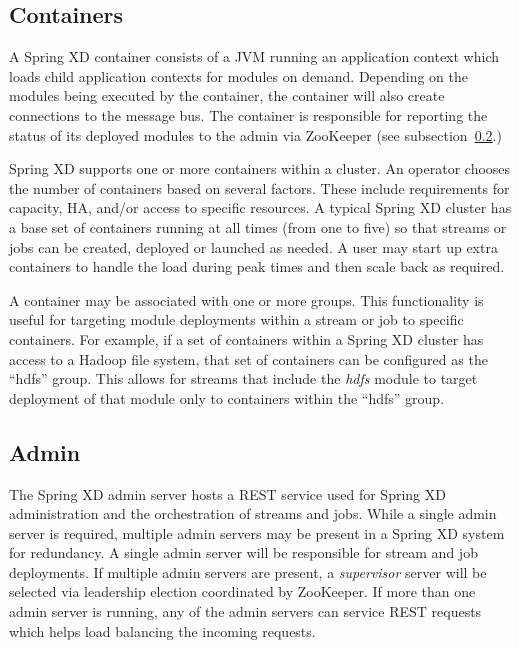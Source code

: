 \subsection{Containers}
A Spring XD container consists of a JVM running an application context which
loads child application contexts for modules on demand. Depending on the modules
being executed by the container, the container will also create connections to
the message bus. The container is responsible for reporting the status of its deployed
modules to the admin via ZooKeeper (see subsection~\ref{subsec:Admin}.)

Spring XD supports one or more containers within a cluster. An operator
chooses the number of containers based on several factors. These include requirements
for capacity, HA, and/or access to specific resources. A typical Spring XD cluster
has a base set of containers running at all times (from one to five) so that streams
or jobs can be created, deployed or launched as needed. A user may start up extra
containers to handle the load during peak times and then scale back as required.

A container may be associated with one or more groups. This functionality is useful
for targeting module deployments within a stream or job to specific containers.
For example, if a set of containers within a Spring XD cluster has access to
a Hadoop file system, that set of containers can be configured as the ``hdfs'' group.
This allows for streams that include the \emph{hdfs} module to target deployment of
that module only to containers within the ``hdfs'' group.

\subsection{Admin}
\label{subsec:Admin}
The Spring XD admin server hosts a REST service used for Spring XD
administration and the orchestration of streams and jobs. While a single
admin server is required, multiple admin servers may be present in a Spring XD
system for redundancy. A single admin server will be responsible for stream
and job deployments. If multiple admin servers are present, a \emph{supervisor}
server will be selected via leadership election coordinated by ZooKeeper.
If more than one admin server is running, any of the admin servers
can service REST requests which helps load balancing the incoming requests.


